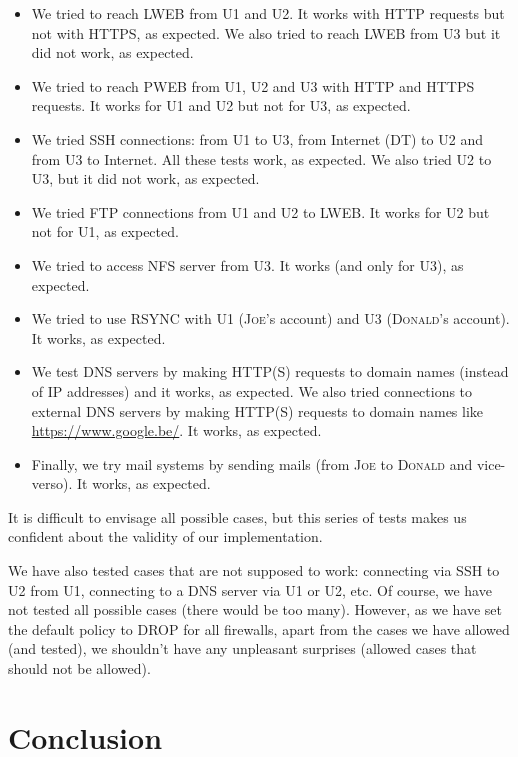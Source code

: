 \documentclass[a4paper, 12pt]{article}
\begin{document}
    \begin{itemize}
        \item We tried to reach LWEB from U1 and U2. It works with HTTP requests but not with HTTPS, as expected. We also tried to reach LWEB from U3 but it did not work, as expected.
        \item We tried to reach PWEB from U1, U2 and U3 with HTTP and HTTPS requests. It works for U1 and U2 but not for U3, as expected.
        \item We tried SSH connections: from U1 to U3, from Internet (DT) to U2 and from U3 to Internet. All these tests work, as expected. We also tried U2 to U3, but it did not work, as expected.
        \item We tried FTP connections from U1 and U2 to LWEB. It works for U2 but not for U1, as expected.
        \item We tried to access NFS server from U3. It works (and only for U3), as expected.
        \item We tried to use RSYNC with U1 (\textsc{Joe}'s account) and U3 (\textsc{Donald}'s account). It works, as expected.
        \item We test DNS servers by making HTTP(S) requests to domain names (instead of IP addresses) and it works, as expected. We also tried connections to external DNS servers by making HTTP(S) requests to domain names like \url{https://www.google.be/}. It works, as expected.
        \item Finally, we try mail systems by sending mails (from \textsc{Joe} to \textsc{Donald} and vice-verso). It works, as expected.
    \end{itemize}
    
    It is difficult to envisage all possible cases, but this series of tests makes us confident about the validity of our implementation.
    
    We have also tested cases that are not supposed to work: connecting via SSH to U2 from U1, connecting to a DNS server via U1 or U2, etc. Of course, we have not tested all possible cases (there would be too many). However, as we have set the default policy to DROP for all firewalls, apart from the cases we have allowed (and tested), we shouldn't have any unpleasant surprises (allowed cases that should not be allowed).
    
    \section{Conclusion}
    
\end{document}
